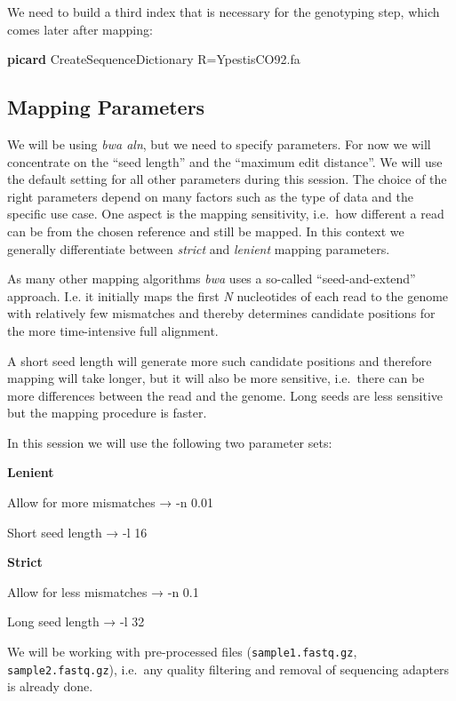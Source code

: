 \documentclass[
  letterpaper,
]{book}
\newenvironment{Shaded}{}{}
\newcommand{\ExtensionTok}[1]{\textcolor[rgb]{0.84,0.23,0.29}{\textbf{#1}}}
\newcommand{\NormalTok}[1]{\textcolor[rgb]{0.14,0.16,0.18}{#1}}
\begin{document}
We need to build a third index that is necessary for the genotyping
step, which comes later after mapping:

\begin{Shaded}
\begin{Highlighting}[]
\ExtensionTok{picard}\NormalTok{ CreateSequenceDictionary R=YpestisCO92.fa}
\end{Highlighting}
\end{Shaded}

\hypertarget{mapping-parameters}{%
\subsection{Mapping Parameters}\label{mapping-parameters}}

We will be using \emph{bwa aln}, but we need to specify parameters. For
now we will concentrate on the ``seed length'' and the ``maximum edit
distance''. We will use the default setting for all other parameters
during this session. The choice of the right parameters depend on many
factors such as the type of data and the specific use case. One aspect
is the mapping sensitivity, i.e.~how different a read can be from the
chosen reference and still be mapped. In this context we generally
differentiate between \emph{strict} and \emph{lenient} mapping
parameters.

As many other mapping algorithms \emph{bwa} uses a so-called
``seed-and-extend'' approach. I.e. it initially maps the first \emph{N}
nucleotides of each read to the genome with relatively few mismatches
and thereby determines candidate positions for the more time-intensive
full alignment.

A short seed length will generate more such candidate positions and
therefore mapping will take longer, but it will also be more sensitive,
i.e.~there can be more differences between the read and the genome. Long
seeds are less sensitive but the mapping procedure is faster.

In this session we will use the following two parameter sets:

\textbf{Lenient}

Allow for more mismatches → -n 0.01

Short seed length → -l 16

\textbf{Strict}

Allow for less mismatches → -n 0.1

Long seed length → -l 32

We will be working with pre-processed files (\texttt{sample1.fastq.gz},
\texttt{sample2.fastq.gz}), i.e.~any quality filtering and removal of
sequencing adapters is already done.
\end{document}
